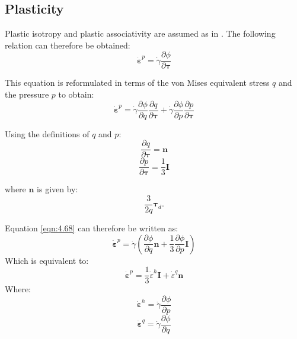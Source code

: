 \documentclass[sn-mathphys,Numbered,draft]{sn-jnl}%
\begin{document}
\subsection{Plasticity}

Plastic isotropy and plastic associativity are assumed as in \citet{bettaieb_numerical_2011}. The following relation can therefore be obtained:
\begin{equation}
\label{eqn:4.67}
	\dot{\boldsymbol{\varepsilon}}^p=\dot{\gamma}\frac{\partial\phi}{\partial\boldsymbol{\tau}}	
\end{equation}

This equation is reformulated in terms of the von Mises equivalent stress $q$ and the pressure $p$ to obtain:
\begin{equation}
	\label{eqn:4.68}
 \dot{\boldsymbol{\varepsilon}}^p=\dot{\gamma}\frac{\partial\phi}{\partial q}\frac{\partial q}{\partial\boldsymbol{\tau}}+\dot{\gamma}\frac{\partial\phi}{\partial p}\frac{\partial p}{\partial\boldsymbol{\tau}}
\end{equation}

Using the definitions of $q$ and $p$:
\begin{equation}
	\frac{\partial q}{\partial\boldsymbol{\tau}}=\mathbf{n}
 \end{equation}
 \begin{equation}
 \frac{\partial p}{\partial\boldsymbol{\tau}}=\frac{1}{3}\mathbf{I}	
\end{equation}

where $\mathbf{n}$ is given by:
\begin{equation}
\frac{3}{2q}\mathbf{\tau}_d.
\end{equation}

Equation \ref{eqn:4.68} can therefore be written as:
\begin{equation}
	\dot{\boldsymbol{\varepsilon}}^p=\dot{\gamma}\left(\frac{\partial\phi}{\partial q}\mathbf{n}+\frac{1}{3}\frac{\partial\phi}{\partial p}\mathbf{I}\right)	
\end{equation}
Which is equivalent to:
\begin{equation}
\label{eqn:4.73}
\dot{\boldsymbol{\varepsilon}}^p=\frac{1}{3} \dot{\varepsilon}^h \boldsymbol{I}+\dot{\varepsilon}^q \boldsymbol{n}
\end{equation}
Where:
\begin{equation}
\label{eqn:4.74}
\dot{ \boldsymbol{\varepsilon}}^h=\dot{\gamma} \frac{\partial \phi}{\partial p} 
\end{equation}
\begin{equation}
\label{eqn:4.75}
\dot{ \boldsymbol{\varepsilon}}^q=\dot{\gamma} \frac{\partial \phi}{\partial q}
\end{equation}
\end{document}
